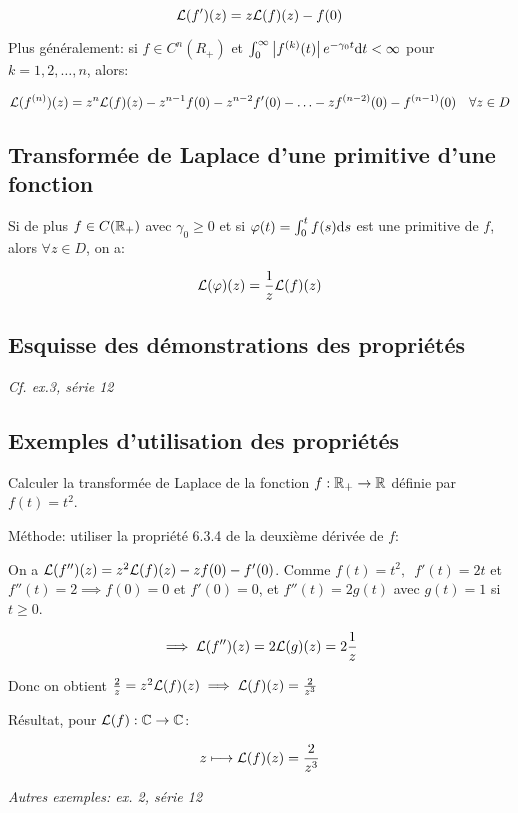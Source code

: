 \[
    \mathcal{L}(f')(z) = z \mathcal{L}(f)(z) - f(0)
\]

Plus généralement: si $f \in C^n (R_+)$ et $\int_0^\infty \left|f^{(k)}(t)\right| e^{-\gamma_0 t} \mathrm{d}t < \infty$ pour $k = 1, 2, \ldots, n$, alors:

\[
    \mathcal{L}(f^{(n)})(z) = z^n \mathcal{L}(f)(z) - z^{n-1} f(0) - z^{n-2} f'(0)
    - \ldots - z f^{(n-2)}(0) - f^{(n-1)}(0) \quad \forall z \in D
\]

\subsection{Transformée de Laplace d'une primitive d'une fonction}

Si de plus $f \in C(\mathbb{R}_+)$ avec $\gamma_0 \geq 0$ et si $\varphi(t) = \int_0^t f(s) \mathrm{d}s$ est une primitive de $f$, alors $\forall z \in D$, on a:

\[
    \mathcal{L}(\varphi)(z) = \frac{1}{z} \mathcal{L}(f)(z)
\]

\subsection{Esquisse des démonstrations des propriétés}

\textit{Cf. ex.3, série 12}

\subsection{Exemples d'utilisation des propriétés}

\begin{example}
    Calculer la transformée de Laplace de la fonction $f: \mathbb{R}_+ \rightarrow \mathbb{R}$ définie par $f(t) = t^2$.
    
    Méthode: utiliser la propriété 6.3.4 de la deuxième dérivée de $f$:
    
    On a $\mathcal{L}(f'')(z) = z^2 \mathcal{L}(f)(z) - zf(0) - f'(0)$.
    Comme $f(t) = t^2, \enspace f'(t) = 2t$ et $f''(t) = 2 \implies f(0) = 0$ et $f'(0) = 0$, et $f''(t) = 2g(t)$ avec $g(t) = 1$ si $t \geq 0$.
    
    \[ \implies \mathcal{L}(f'')(z) = 2 \mathcal{L}(g)(z) = 2 \frac{1}{z} \]
    
    Donc on obtient $\frac{2}{z} = z^2 \mathcal{L}(f)(z) \implies \mathcal{L}(f)(z) = \frac{2}{z^3}$
    
    Résultat, pour $\mathcal{L}(f): \mathbb{C} \rightarrow \mathbb{C}$:
    
    \[ z \longmapsto \mathcal{L}(f)(z) = \frac{2}{z^3} \]
    
    \textit{Autres exemples: ex. 2, série 12}
\end{example}



